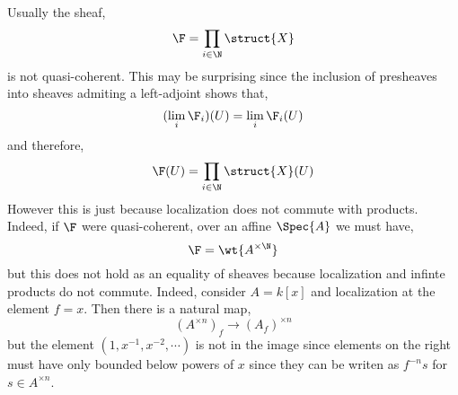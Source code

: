 \documentclass[12pt]{article}
\begin{document}
Usually the sheaf,
\[ \F = \prod_{i \in \N} \struct{X} \]
is not quasi-coherent. This may be surprising since the inclusion of presheaves into sheaves admiting a left-adjoint shows that,
\[ (\lim_i \F_i)(U) = \lim_i \F_i(U) \]
and therefore,
\[ \F(U) = \prod_{i \in \N} \struct{X}(U) \]
However this is just because localization does not commute with products. Indeed, if $\F$ were quasi-coherent, over an affine $\Spec{A}$ we must have,
\[ \F = \wt{A^{\times \N}} \]
but this does not hold as an equality of sheaves because localization and infinte products do not commute. Indeed, consider $A = k[x]$ and localization at the element $f = x$. Then there is a natural map,
\[ (A^{\times n})_f \to (A_f)^{\times n} \]
but the element $(1, x^{-1}, x^{-2}, \cdots)$ is not in the image since elements on the right must have only bounded below powers of $x$ since they can be writen as $f^{-n} s$ for $s \in A^{\times n}$. 
\end{document}
